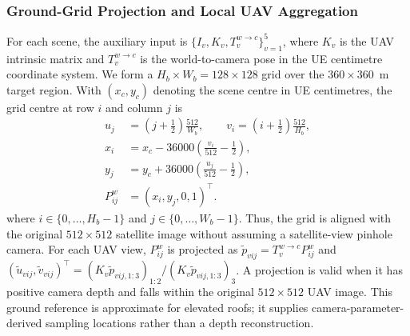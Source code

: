 \documentclass[letterpaper,journal]{IEEEtran}
\begin{document}
\subsubsection{Ground-Grid Projection and Local UAV Aggregation}
For each scene, the auxiliary input is $\{I_v,K_v,T_v^{w\rightarrow c}\}_{v=1}^{5}$, where
$K_v$ is the UAV intrinsic matrix and $T_v^{w\rightarrow c}$ is the world-to-camera pose in the
UE centimetre coordinate system. We form a $H_b\times W_b=128\times128$ grid over the
$360\times360$~m target region. With $(x_c,y_c)$ denoting the scene centre in UE centimetres,
the grid centre at row $i$ and column $j$ is
\begin{equation}
\begin{aligned}
u_j&=\left(j+\tfrac{1}{2}\right)\frac{512}{W_b},\qquad
v_i=\left(i+\tfrac{1}{2}\right)\frac{512}{H_b},\\
x_i&=x_c-36000\left(\frac{v_i}{512}-\tfrac{1}{2}\right),\\
y_j&=y_c+36000\left(\frac{u_j}{512}-\tfrac{1}{2}\right),\\
P^w_{ij}&=\left(x_i,y_j,0,1\right)^{\top}.
\end{aligned}
\label{eq:ground_projection}
\end{equation}
where $i\in\{0,\ldots,H_b-1\}$ and $j\in\{0,\ldots,W_b-1\}$. Thus, the grid is aligned with the
original $512\times512$ satellite image without assuming a satellite-view pinhole camera. For each
UAV view, $P^w_{ij}$ is projected as $\tilde p_{vij}=T_v^{w\rightarrow c}P^w_{ij}$ and $(\tilde
u_{vij},\tilde v_{vij})^{\top}=(K_v\tilde p_{vij,1:3})_{1:2}/(K_v\tilde p_{vij,1:3})_3$. A
projection is valid when it has positive camera depth and falls within the original
$512\times512$ UAV image. This ground reference is approximate for elevated roofs; it supplies
camera-parameter-derived sampling locations rather than a depth reconstruction.
\end{document}
